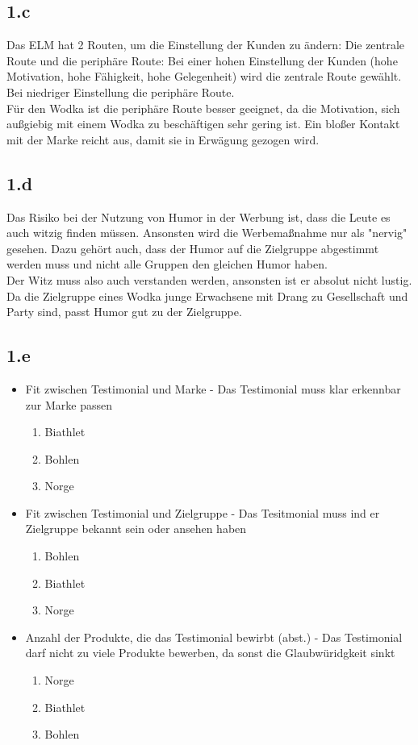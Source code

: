\subsection*{1.c}
Das ELM hat 2 Routen, um die Einstellung der Kunden zu ändern: Die zentrale Route und die periphäre Route: Bei einer hohen Einstellung der Kunden (hohe Motivation, hohe Fähigkeit, hohe Gelegenheit) wird die zentrale Route gewählt. Bei niedriger Einstellung die periphäre Route. \\
Für den Wodka ist die periphäre Route besser geeignet, da die Motivation, sich außgiebig mit einem Wodka zu beschäftigen sehr gering ist. Ein bloßer Kontakt mit der Marke reicht aus, damit sie in Erwägung gezogen wird.

\subsection*{1.d}
Das Risiko bei der Nutzung von Humor in der Werbung ist, dass die Leute es auch witzig finden müssen. Ansonsten wird die Werbemaßnahme nur als "nervig" gesehen. Dazu gehört auch, dass der Humor auf die Zielgruppe abgestimmt werden muss und nicht alle Gruppen den gleichen Humor haben. \\
Der Witz muss also auch verstanden werden, ansonsten ist er absolut nicht lustig. \\
Da die Zielgruppe eines Wodka junge Erwachsene mit Drang zu Gesellschaft und Party sind, passt Humor gut zu der Zielgruppe.

\subsection*{1.e}
\begin{itemize}
    \item Fit zwischen Testimonial und Marke - Das Testimonial muss klar erkennbar zur Marke passen
    \begin{enumerate}
        \item Biathlet
        \item Bohlen
        \item Norge
    \end{enumerate}
    \item Fit zwischen Testimonial und Zielgruppe - Das Tesitmonial muss ind er Zielgruppe bekannt sein oder ansehen haben
    \begin{enumerate}
        \item Bohlen
        \item Biathlet
        \item Norge
    \end{enumerate}
    \item Anzahl der Produkte, die das Testimonial bewirbt (abst.) - Das Testimonial darf nicht zu viele Produkte bewerben, da sonst die Glaubwüridgkeit sinkt
    \begin{enumerate}
        \item Norge
        \item Biathlet
        \item Bohlen
    \end{enumerate}
\end{itemize}

